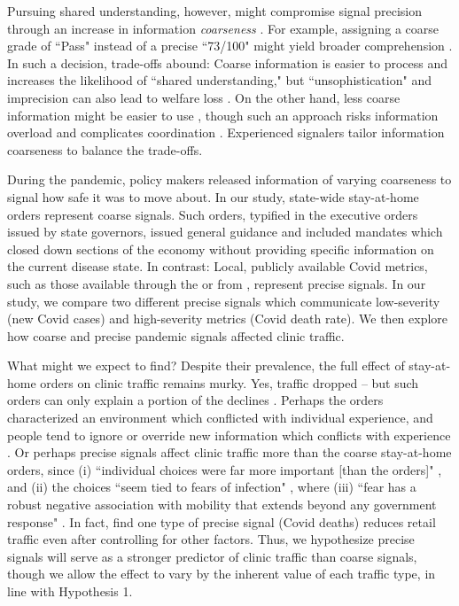  Pursuing shared understanding, however, might compromise signal precision through an increase in information \textit{coarseness} \citep{Morris2007}. For example, assigning a coarse grade of “Pass" instead of a precise “73/100" might yield broader comprehension \citep{Harbaugh2018}. In such a decision, trade-offs abound: Coarse information is easier to process \citep{Harbaugh2018} and increases the likelihood of “shared understanding," but “unsophistication" and imprecision can also lead to welfare loss \citep{Morris2007}. On the other hand, less coarse information might be easier to use \citep{Morris2007,Chahrour2017}, though such an approach risks information overload \citep{Eppler2010} and complicates coordination \citep{Morris2002}. Experienced signalers tailor information coarseness to balance the trade-offs.
 
 During the pandemic, policy makers released information of varying coarseness to signal how safe it was to move about. In our study, state-wide stay-at-home orders represent coarse signals. Such orders, typified in the executive orders issued by state governors, issued general guidance and included mandates which closed down sections of the economy without providing specific information on the current disease state. In contrast: Local, publicly available Covid metrics, such as those available through the \cite{NYTimes2021} or from \cite{JHU2021}, represent precise signals. In our study, we compare two different precise signals which communicate low-severity (new Covid cases) and high-severity metrics (Covid death rate). We then explore how coarse and precise pandemic signals affected clinic traffic.
 
 What might we expect to find? Despite their prevalence, the full effect of stay-at-home orders on clinic traffic remains murky. Yes, traffic dropped -- but such orders can only explain a portion of the declines \citep{Cantor2020,Ziedan2020}. Perhaps the orders characterized an environment which conflicted with individual experience, and people tend to ignore or override new information which conflicts with experience \citep{Staats2018,Kesavan2020}. Or perhaps precise signals affect clinic traffic more than the coarse stay-at-home orders, since (i) “individual choices were far more important [than the orders]" \citep[p. 1]{Goolsbee2020_key}, and (ii) the choices “seem tied to fears of infection" \citep[p. 1]{Goolsbee2020_key}, where (iii) “fear has a robust negative association with mobility that extends beyond any government response" \citep[p. 15]{Alfaro2020}. In fact, \cite{Goolsbee2020_key} find one type of precise signal (Covid deaths) reduces retail traffic even after controlling for other factors. Thus, we hypothesize precise signals will serve as a stronger predictor of clinic traffic than coarse signals, though we allow the effect to vary by the inherent value of each traffic type, in line with Hypothesis 1. 
 
